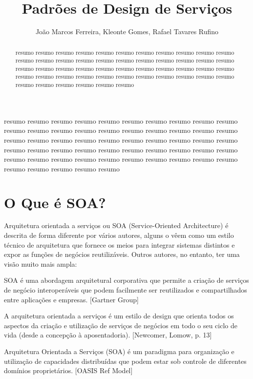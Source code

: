 \documentclass[12pt]{article}
\title{Padrões de Design de Serviços}
\author{João Marcos Ferreira\inst{1}, Kleonte Gomes\inst{2}, Rafael Tavares Rufino\inst{3} }
\begin{document}
 

\maketitle

\begin{abstract}
   resumo resumo resumo resumo resumo resumo resumo resumo resumo resumo resumo resumo resumo resumo resumo resumo resumo resumo resumo resumo resumo resumo resumo resumo resumo resumo resumo resumo resumo resumo resumo resumo resumo resumo resumo resumo resumo resumo resumo resumo resumo resumo resumo resumo resumo resumo resumo resumo resumo resumo 
\end{abstract}
   
\begin{resumo} 
  resumo resumo resumo resumo resumo resumo resumo resumo resumo resumo resumo resumo resumo resumo resumo resumo resumo resumo resumo resumo resumo resumo resumo resumo resumo resumo resumo resumo resumo resumo resumo resumo resumo resumo resumo resumo resumo resumo resumo resumo resumo resumo resumo resumo resumo resumo resumo resumo resumo resumo resumo resumo resumo resumo resumo
\end{resumo}


\section{O Que é SOA?}

Arquitetura orientada a serviços ou SOA (Service-Oriented Architecture) é descrita de forma diferente por vários autores, alguns o vêem como um estilo técnico de arquitetura que fornece os meios para integrar sistemas distintos e expor as funções de negócios reutilizáveis. Outros autores, no entanto, ter uma visão muito mais ampla:

SOA é uma abordagem arquitetural corporativa que permite a criação de serviços de negócio interoperáveis que podem facilmente ser reutilizados e compartilhados entre aplicações e empresas. [Gartner Group]


A arquitetura orientada a serviços é um estilo de design que orienta todos os aspectos da criação e utilização de serviços de negócios em todo o seu ciclo de vida (desde a concepção à aposentadoria). [Newcomer, Lomow, p. 13]


Arquitetura Orientada a Serviços (SOA) é um paradigma para organização e utilização de capacidades distribuídas que podem estar sob controle de diferentes domínios proprietários. [OASIS Ref Model]
\end{document}
